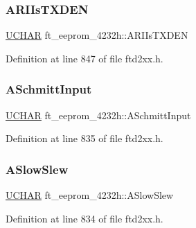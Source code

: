 \subsubsection{\texorpdfstring{A\+R\+I\+Is\+T\+X\+D\+EN}{ARIIsTXDEN}}
{\footnotesize\ttfamily \hyperlink{CatCaloProto40MHz_2inc_2WinTypes_8h_a4f4bb67531a9bf6f0b9c6ad76aeba587}{U\+C\+H\+AR} ft\+\_\+eeprom\+\_\+4232h\+::\+A\+R\+I\+Is\+T\+X\+D\+EN}



Definition at line 847 of file ftd2xx.\+h.

\mbox{\label{structft__eeprom__4232h_a47fdc0898935fa1d2c60cfcf93685231}} 
\subsubsection{\texorpdfstring{A\+Schmitt\+Input}{ASchmittInput}}
{\footnotesize\ttfamily \hyperlink{CatCaloProto40MHz_2inc_2WinTypes_8h_a4f4bb67531a9bf6f0b9c6ad76aeba587}{U\+C\+H\+AR} ft\+\_\+eeprom\+\_\+4232h\+::\+A\+Schmitt\+Input}



Definition at line 835 of file ftd2xx.\+h.

\mbox{\label{structft__eeprom__4232h_a1e66ea6b513734d830d86565441b6318}} 
\subsubsection{\texorpdfstring{A\+Slow\+Slew}{ASlowSlew}}
{\footnotesize\ttfamily \hyperlink{CatCaloProto40MHz_2inc_2WinTypes_8h_a4f4bb67531a9bf6f0b9c6ad76aeba587}{U\+C\+H\+AR} ft\+\_\+eeprom\+\_\+4232h\+::\+A\+Slow\+Slew}



Definition at line 834 of file ftd2xx.\+h.

\mbox{\label{structft__eeprom__4232h_ac42c22b82bdca1458089ac49f0eaefa1}} 
